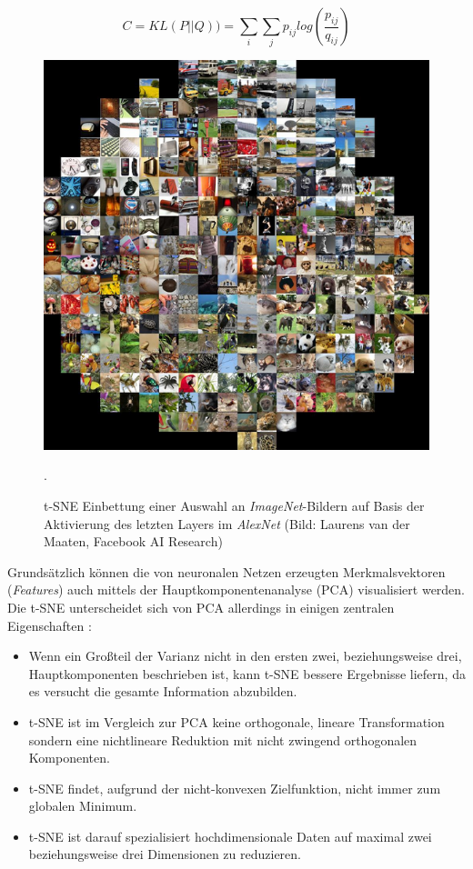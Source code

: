 \begin{equation}
\label{eq:tsne}
C = KL(P||Q) ) = \sum_{i}^{} \sum_{j}^{} p_{ij} log(\frac{p_{ij}}{q_{ij}})
\end{equation}


\begin{figure}
\centering
\includegraphics[width=0.5\linewidth]{images/4_t_sne}
\caption[]{t-SNE Einbettung einer Auswahl an \textit{ImageNet}-Bildern auf Basis der Aktivierung des letzten Layers im \textit{AlexNet} (Bild: Laurens van der Maaten, Facebook AI Research)}.
\label{fig:4_t_sne}
\end{figure}


Grundsätzlich können die von neuronalen Netzen erzeugten Merkmalsvektoren (\textit{Features}) auch mittels der Hauptkomponentenanalyse (PCA) visualisiert werden. Die t-SNE unterscheidet sich von PCA allerdings in einigen zentralen Eigenschaften \cite[vgl. hierzu und im Folgenden][]{Laurens2008}:

\begin{itemize}
\item Wenn ein Großteil der Varianz nicht in den ersten zwei, beziehungsweise drei, Hauptkomponenten beschrieben ist, kann t-SNE bessere Ergebnisse liefern, da es versucht die gesamte Information abzubilden.
\item t-SNE ist im Vergleich zur PCA keine orthogonale, lineare Transformation sondern eine nichtlineare Reduktion mit nicht zwingend orthogonalen Komponenten.
\item t-SNE findet, aufgrund der nicht-konvexen Zielfunktion, nicht immer zum globalen Minimum.
\item t-SNE ist darauf spezialisiert hochdimensionale Daten auf maximal zwei beziehungsweise drei Dimensionen zu reduzieren.
\end{itemize}



